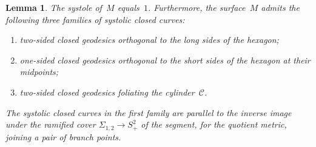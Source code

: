 \documentclass[12pt,reqno]{amsart}
\newtheorem{lemma}[theorem]{Lemma}
\theoremstyle{definition}
\numberwithin{equation}{section}
\numberwithin{equation}{section}
\begin{document}
\begin{lemma}
The systole of~$M$ equals~$1$.  Furthermore, the surface~$M$ admits
the following three families of systolic closed curves:
\begin{enumerate}
\item two-sided closed geodesics orthogonal to the long sides of the
  hexagon; \label{f1}
\item one-sided closed geodesics orthogonal to the short sides of the
  hexagon at their midpoints;
\item two-sided closed geodesics foliating the cylinder~$\mathcal{C}$.
\end{enumerate}
The systolic closed curves in the first family are parallel to the inverse image under the ramified cover $\Sigma_{1,2} \to S^2_+$ of the segment, for the quotient metric, joining a pair of branch points.
\end{lemma}
\end{document}
